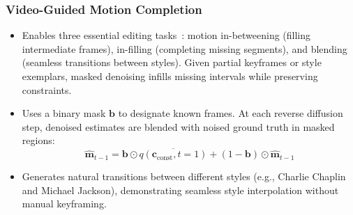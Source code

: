 \subsubsection{Video-Guided Motion Completion}
\begin{itemize}
\setlength{\itemsep}{-0.5ex} %
\setlength{\parsep}{0ex} %
    \item Enables three essential editing tasks~\cite{singshot2021,robmo2020}: motion in-betweening (filling intermediate frames), in-filling (completing missing segments), and blending (seamless transitions between styles). Given partial keyframes or style exemplars, masked denoising infills missing intervals while preserving constraints.~\cite{repaint2022}
    \item Uses a binary mask $\mathbf{b}$ to designate known frames. At each reverse diffusion step, denoised estimates are blended with noised ground truth in masked regions:
    \[
    \hat{\mathbf{m}}_{t-1} = \mathbf{b}\odot\overline{q(\mathbf{c}_{\text{const}},t=1)} + (1-\mathbf{b})\odot\hat{\mathbf{m}}_{t-1}
    \]
    \item Generates natural transitions between different styles (e.g., Charlie Chaplin and Michael Jackson), demonstrating seamless style interpolation without manual keyframing.
\end{itemize}
